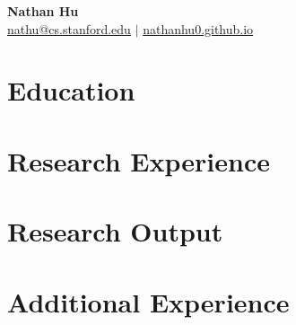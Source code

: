\documentclass[11pt]{article}
\newcommand{\mytitle}[3]{
    \vspace*{-0.5in}
    \begin{center}
        \LARGE\textbf{#1}\normalsize \\[2pt]
        \small\href{mailto:#2}{#2} $|$ \href{#3}{nathanhu0.github.io}\normalsize
    \end{center}
}
\begin{document}
\mytitle{Nathan Hu}{nathu@cs.stanford.edu}{https://nathanhu0.github.io}
\RaggedRight

\section*{Education}


\section*{Research Experience}
\label{exp_research}


\section*{Research Output}
\label{pubs}
\nocite{*}
\printbibliography[sorting=ydnt,heading=none]

\section*{Additional Experience}
\label{work}


% 

% 
\end{document}
